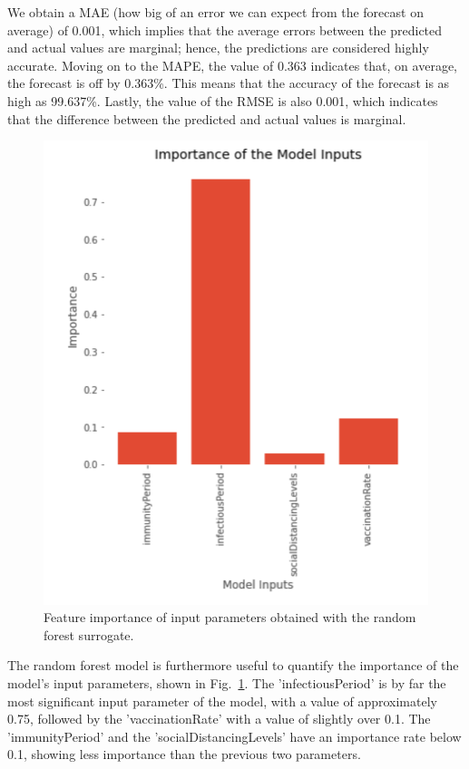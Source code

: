 \documentclass[smallextended]{svjour3}       %
\begin{document}

We obtain a MAE (how big of an error we can expect from the forecast on average) of 0.001, which implies that the average errors between the predicted and actual values are marginal; hence, the predictions are considered highly accurate. Moving on to the MAPE, the value of 0.363 indicates that, on average, the forecast is off by 0.363\%. This means that the accuracy of the forecast is as high as 99.637\%. Lastly, the value of the RMSE is also 0.001, which indicates that the difference between the predicted and actual values is marginal.

\begin{figure}
	\centering
	\includegraphics[width=0.7\linewidth]{figures/randomForest.png}
	\caption{Feature importance of input parameters obtained with the random forest surrogate.\label{fig:randomForest}}
\end{figure}


The random forest model is furthermore useful to quantify the importance of the model's input parameters, shown in Fig.~\ref{fig:randomForest}. The 'infectiousPeriod' is by far the most significant input parameter of the model, with a value of approximately 0.75, followed by the 'vaccinationRate' with a value of slightly over 0.1. The 'immunityPeriod' and the 'socialDistancingLevels' have an importance rate below 0.1, showing less importance than the previous two parameters.
\end{document}
